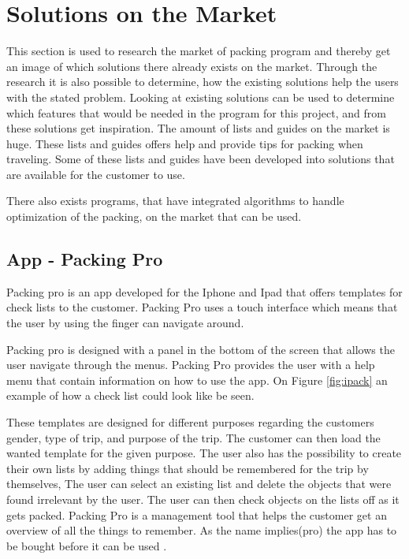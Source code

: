 \section{Solutions on the Market}
\label{sec:Solution}
This section is used to research the market of packing program and thereby get an image of which solutions there already exists on the market. Through the research it is also possible to determine, how the existing solutions help the users with the stated problem. Looking at existing solutions can be used to determine which features that would be needed in the program for this project, and from these solutions get inspiration.
The amount of lists and guides on the market is huge. These lists and guides offers help and provide tips for packing when traveling. Some of these lists and guides have been developed into solutions that are available for the customer to use.

There also exists programs, that have integrated algorithms to handle optimization of the packing, on the market that can be used.

\subsection{App - Packing Pro}

Packing pro is an app developed for the Iphone and Ipad that offers templates for check lists to the customer. Packing Pro uses a touch interface which means that the user by using the finger can navigate around.


Packing pro is designed with a panel in the bottom of the screen that allows the user navigate through the menus. Packing Pro provides the user with a help menu that contain information on how to use the app. On Figure \ref{fig:ipack} an example of how a check list could look like be seen.

These templates are designed for different purposes regarding the customers gender, type of trip, and purpose of the trip.
The customer can then load the wanted template for the given purpose. The user also has the possibility to create their own lists by adding things that should be remembered for the trip by themselves, The user can select an existing list and delete the objects that were found irrelevant by the user. The user can then check objects on the lists off as it gets packed. Packing Pro is a management tool that helps the customer get an overview of all the things to remember. As the name implies(pro) the app has to be bought before it can be used  \citep{packingpro}.

